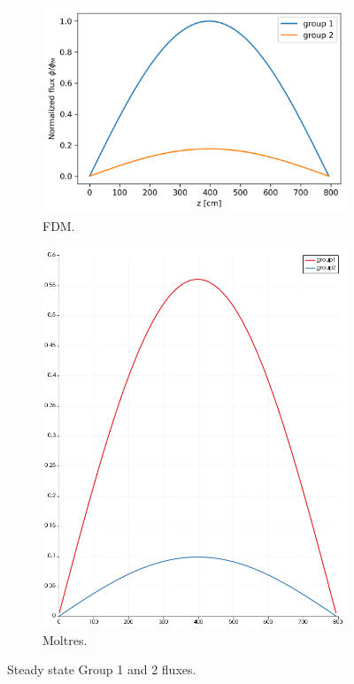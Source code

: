 \documentclass[11pt,letterpaper]{article}
\begin{document}
	\begin{figure}[htbp!]
		\centering
		\begin{subfigure}[t]{0.4\textwidth}
			\centering
			\includegraphics[width=\linewidth]{1D-fuel-eig-FDM}
			\caption{FDM.}
		\end{subfigure}
		\begin{subfigure}[t]{0.4\textwidth}
			\centering
			\includegraphics[width=\linewidth]{1D-fuel-eig}
			\caption{Moltres.}
		\end{subfigure}
		\hfill
		\caption{Steady state Group 1 and 2 fluxes.}
		\label{fig:1D-fuel-eig}
	\end{figure}
\end{document}
